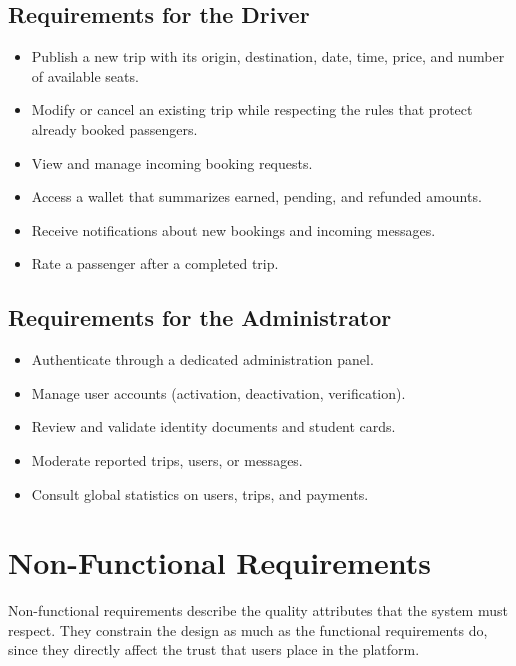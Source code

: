 \subsection{Requirements for the Driver}

\begin{itemize}[noitemsep]
    \item Publish a new trip with its origin, destination, date, time, price, and number of available seats.
    \item Modify or cancel an existing trip while respecting the rules that protect already booked passengers.
    \item View and manage incoming booking requests.
    \item Access a wallet that summarizes earned, pending, and refunded amounts.
    \item Receive notifications about new bookings and incoming messages.
    \item Rate a passenger after a completed trip.
\end{itemize}

\subsection{Requirements for the Administrator}

\begin{itemize}[noitemsep]
    \item Authenticate through a dedicated administration panel.
    \item Manage user accounts (activation, deactivation, verification).
    \item Review and validate identity documents and student cards.
    \item Moderate reported trips, users, or messages.
    \item Consult global statistics on users, trips, and payments.
\end{itemize}


\section{Non-Functional Requirements}

Non-functional requirements describe the quality attributes that the system must respect. They constrain the design as much as the functional requirements do, since they directly affect the trust that users place in the platform.

